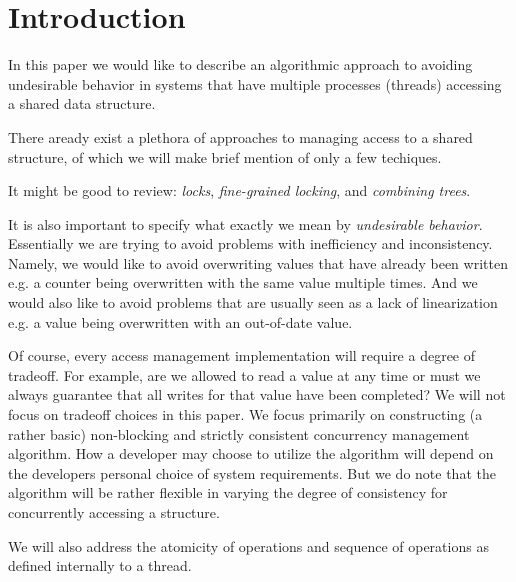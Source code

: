 \section{Introduction}

In this paper we would like to describe an algorithmic approach to avoiding undesirable behavior in systems that have multiple processes (threads) accessing a shared data structure.

There aready exist a plethora of approaches to managing access to a shared structure, of which we will make brief mention of only a few techiques. 

It might be good to review: \textit{locks}, \textit{fine-grained locking}, and \textit{combining trees}.

It is also important to specify what exactly we mean by \textit{undesirable behavior}. Essentially we are trying to avoid problems with inefficiency and inconsistency. Namely, we would like to avoid overwriting values that have already been written e.g. a counter being overwritten with the same value multiple times. And we would also like to avoid problems that are usually seen as a lack of linearization e.g. a value being overwritten with an out-of-date value. 

Of course, every access management implementation will require a degree of tradeoff. For example, are we allowed to read a value at any time or must we always guarantee that all writes for that value have been completed? We will not focus on tradeoff choices in this paper. We focus primarily on constructing (a rather basic) non-blocking and strictly consistent concurrency management algorithm. How a developer may choose to utilize the algorithm will depend on the developers personal choice of system requirements. But we do note that the algorithm will be rather flexible in varying the degree of consistency for concurrently accessing a structure.

We will also address the atomicity of operations and sequence of operations as defined internally to a thread.


\begin{con-def}
	\label{cds}

\end{con-def}